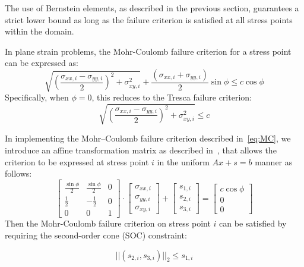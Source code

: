 The use of Bernstein elements, as described in the previous section, guarantees a strict lower bound as long as the failure criterion is satisfied at all stress points within the domain. 

In plane strain problems, the Mohr-Coulomb failure criterion for a stress point can be expressed as:
\begin{equation}
\sqrt{(\frac{\sigma_{xx, i}-\sigma_{yy, i}}{2})^2 + \sigma_{xy, i}^2} +  \frac{(\sigma_{xx, i}+\sigma_{yy, i})}{2}\sin \phi \leq c \cos \phi
\label{eq:MC}
\end{equation} Specifically, when $\phi = 0$, this reduces to the Tresca failure criterion:
\begin{equation}
\sqrt{(\frac{\sigma_{xx, i}-\sigma_{yy, i}}{2})^2 + \sigma_{xy, i}^2}  \leq c
\label{eq:Tresca}
\end{equation}

In implementing the Mohr–Coulomb failure criterion described in~\eqref{eq:MC}, we introduce an affine transformation matrix as described in~\cite{2DLB}, that allows the criterion to be expressed at stress point $i$ in the uniform $Ax+s=b$ manner as follows:
\begin{equation}
\begin{bmatrix}
\frac{\sin\phi}{2} & \frac{\sin\phi}{2} & 0 \\
\frac{1}{2} & -\frac{1}{2} & 0 \\
0 & 0 & 1
\end{bmatrix}
\cdot
\begin{bmatrix}
\sigma_{xx, i} \\
\sigma_{yy, i} \\
\sigma_{xy, i}
\end{bmatrix}
+
\begin{bmatrix}
s_{1,i} \\
s_{2,i} \\
s_{3,i}
\end{bmatrix}
=
\begin{bmatrix}
c \cos\phi \\
0 \\
0
\end{bmatrix}
\label{eq:2DSOC}
\end{equation} Then the Mohr-Coulomb failure criterion on stress point $i$ can be satisfied by requiring the second-order cone (SOC) constraint:

\begin{equation}
||(s_{2,i}, s_{3,i})||_2 \leq s_{1,i}
\label{eq:2DConic}
\end{equation}


